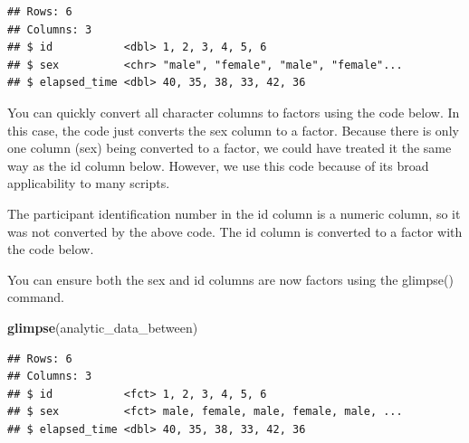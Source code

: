 \documentclass[
]{krantz}
\makeatletter
\newenvironment{Shaded}{\begin{snugshade}}{\end{snugshade}}
\newcommand{\DataTypeTok}[1]{\textcolor[rgb]{0.27,0.27,0.27}{#1}}
\newcommand{\KeywordTok}[1]{\textcolor[rgb]{0.27,0.27,0.27}{\textbf{#1}}}
\newcommand{\NormalTok}[1]{#1}
\newcommand{\OperatorTok}[1]{\textcolor[rgb]{0.43,0.43,0.43}{\textbf{#1}}}
\newcommand{\StringTok}[1]{\textcolor[rgb]{0.5,0.5,0.5}{#1}}
\newenvironment{kframe}{%
\medskip{}
\setlength{\fboxsep}{.8em}
 \def\at@end@of@kframe{}%
 \ifinner\ifhmode%
  \def\at@end@of@kframe{\end{minipage}}%
  \begin{minipage}{\columnwidth}%
 \fi\fi%
 \def\FrameCommand##1{\hskip\@totalleftmargin \hskip-\fboxsep
 \colorbox{shadecolor}{##1}\hskip-\fboxsep
     \hskip-\linewidth \hskip-\@totalleftmargin \hskip\columnwidth}%
 \MakeFramed {\advance\hsize-\width
   \@totalleftmargin\z@ \linewidth\hsize
   \@setminipage}}%
 {\par\unskip\endMakeFramed%
 \at@end@of@kframe}
\renewenvironment{Shaded}{\begin{kframe}}{\end{kframe}}
\makeatother
\begin{document}
\begin{verbatim}
## Rows: 6
## Columns: 3
## $ id           <dbl> 1, 2, 3, 4, 5, 6
## $ sex          <chr> "male", "female", "male", "female"...
## $ elapsed_time <dbl> 40, 35, 38, 33, 42, 36
\end{verbatim}

You can quickly convert all character columns to factors using the code below. In this case, the code just converts the sex column to a factor. Because there is only one column (sex) being converted to a factor, we could have treated it the same way as the id column below. However, we use this code because of its broad applicability to many scripts.

\begin{Shaded}
\end{Shaded}

The participant identification number in the id column is a numeric column, so it was not converted by the above code. The id column is converted to a factor with the code below.

\begin{Shaded}
\end{Shaded}

You can ensure both the sex and id columns are now factors using the glimpse() command.

\begin{Shaded}
\begin{Highlighting}[]
\KeywordTok{glimpse}\NormalTok{(analytic_data_between)}
\end{Highlighting}
\end{Shaded}

\begin{verbatim}
## Rows: 6
## Columns: 3
## $ id           <fct> 1, 2, 3, 4, 5, 6
## $ sex          <fct> male, female, male, female, male, ...
## $ elapsed_time <dbl> 40, 35, 38, 33, 42, 36
\end{verbatim}
\end{document}
